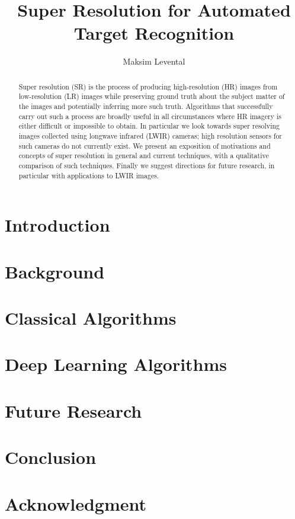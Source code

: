 \documentclass[journal]{IEEEtran}
\begin{document}
    \title{Super Resolution for Automated Target Recognition}
    \author{Maksim Levental}
    \maketitle

    \begin{abstract}
        Super resolution (SR) is the process of producing high-resolution (HR) images from low-resolution (LR)
        images while preserving ground truth about the subject matter of the images and potentially
        inferring more such truth. Algorithms that successfully carry out
        such a process are broadly useful in all circumstances where HR imagery is either difficult or impossible
        to obtain. In particular we look towards super resolving images collected using longwave infrared (LWIR)
        cameras; high resolution sensors for such cameras do not currently exist. We present an exposition of
        motivations and concepts of super resolution in general and current techniques, with a qualitative comparison of
        such techniques. Finally we suggest directions for future research, in particular with applications to LWIR images.
    \end{abstract}

    \section{Introduction}
    \section{Background}
    \section{Classical Algorithms}
    \section{Deep Learning Algorithms}
    \section{Future Research}
    \section{Conclusion}

    \section*{Acknowledgment}



    
    
\end{document}
